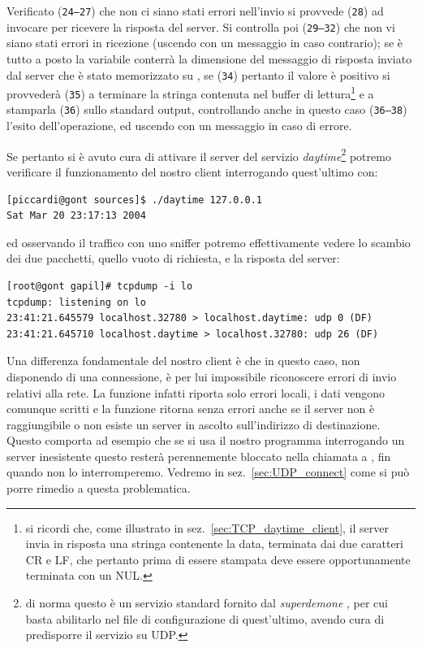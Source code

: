 Verificato (\texttt{\small 24--27}) che non ci siano stati errori nell'invio
si provvede (\texttt{\small 28}) ad invocare  per ricevere la
risposta del server. Si controlla poi (\texttt{\small 29--32}) che non vi
siano stati errori in ricezione (uscendo con un messaggio in caso contrario);
se è tutto a posto la variabile  conterrà la dimensione del
messaggio di risposta inviato dal server che è stato memorizzato su
, se (\texttt{\small 34}) pertanto il valore è positivo si
provvederà (\texttt{\small 35}) a terminare la stringa contenuta nel buffer di
lettura\footnote{si ricordi che, come illustrato in
  sez.~\ref{sec:TCP_daytime_client}, il server invia in risposta una stringa
  contenente la data, terminata dai due caratteri CR e LF, che pertanto prima
  di essere stampata deve essere opportunamente terminata con un NUL.} e a
stamparla (\texttt{\small 36}) sullo standard output, controllando anche in
questo caso (\texttt{\small 36--38}) l'esito dell'operazione, ed uscendo con
un messaggio in caso di errore.

Se pertanto si è avuto cura di attivare il server del servizio
\textit{daytime}\footnote{di norma questo è un servizio standard fornito dal
  \textsl{superdemone} , per cui basta abilitarlo nel file di
  configurazione di quest'ultimo, avendo cura di predisporre il servizio su
  UDP.} potremo verificare il funzionamento del nostro client interrogando
quest'ultimo con:
\begin{verbatim}
[piccardi@gont sources]$ ./daytime 127.0.0.1
Sat Mar 20 23:17:13 2004
\end{verbatim}%
ed osservando il traffico con uno sniffer potremo effettivamente vedere lo
scambio dei due pacchetti, quello vuoto di richiesta, e la risposta del
server:
\begin{verbatim}
[root@gont gapil]# tcpdump -i lo
tcpdump: listening on lo
23:41:21.645579 localhost.32780 > localhost.daytime: udp 0 (DF)
23:41:21.645710 localhost.daytime > localhost.32780: udp 26 (DF)
\end{verbatim}

Una differenza fondamentale del nostro client è che in questo caso, non
disponendo di una connessione, è per lui impossibile riconoscere errori di
invio relativi alla rete. La funzione  infatti riporta solo
errori locali, i dati vengono comunque scritti e la funzione ritorna senza
errori anche se il server non è raggiungibile o non esiste un server in
ascolto sull'indirizzo di destinazione. Questo comporta ad esempio che se si
usa il nostro programma interrogando un server inesistente questo resterà
perennemente bloccato nella chiamata a , fin quando non lo
interromperemo. Vedremo in sez.~\ref{sec:UDP_connect} come si può porre rimedio
a questa problematica.


